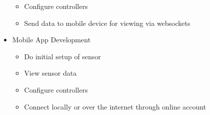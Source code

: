 \begin{itemize}
\begin{itemize}
\begin{itemize}
				 	\end{itemize}
			 		\item Configure controllers
			 		\item Send data to mobile device for viewing via websockets
			 	\end{itemize}
			 \item Mobile App Development
				 \begin{itemize}
				 	\item Do initial setup of sensor
				 	\item View sensor data
				 	\item Configure controllers
				 	\item Connect locally or over the internet through online account
				 \end{itemize}
		 \end{itemize}
		 
